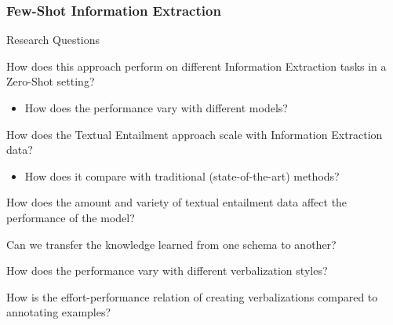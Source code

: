 \documentclass[
    11pt,
    notheorems,
    xcolor={dvipsnames},
    hyperref={
        pdfstartview=FitH, 
        pdftitle={Ikasketa-adibide urriko Informazio-Erauzketa}, 
        pdfauthor={Oscar Sainz Jimenez}, 
        citecolor=secondary, 
    }
]{beamer}
\begin{document}
\subsubsection{Few-Shot Information Extraction}




\begin{frame}
    \begin{block}{Research Questions}
        \begin{itemize}
            {
                \item How does this approach perform on different Information Extraction tasks in a Zero-Shot setting?
                \begin{itemize}
                    \item How does the performance vary with different models?
                \end{itemize}
            }
            {
                \item How does the Textual Entailment approach scale with Information Extraction data?
                \begin{itemize}
                    \item How does it compare with traditional (state-of-the-art) methods?
                \end{itemize} 
            }
            {
                \item How does the amount and variety of textual entailment data affect the performance of the model?
            }
            {
                \item Can we transfer the knowledge learned from one schema to another?
            }
            {
                \item How does the performance vary with different verbalization styles?
            }
            {
                \item How is the effort-performance relation of creating verbalizations compared to annotating examples?
            }
        \end{itemize}
    \end{block}
\end{frame}
\end{document}
